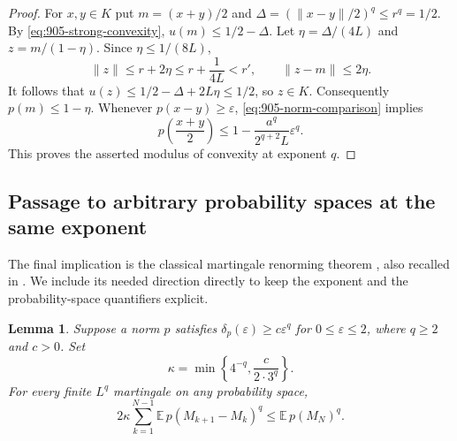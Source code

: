 \documentclass[11pt,a4paper]{article}
\newtheorem{lemma}[theorem]{Lemma}
\theoremstyle{remark}
\begin{document}
\begin{proof}
For $x,y\in K$ put $m=(x+y)/2$ and
$\Delta=(\|x-y\|/2)^q\leq r^q=1/2$.
By \eqref{eq:905-strong-convexity}, $u(m)\leq1/2-\Delta$.
Let $\eta=\Delta/(4L)$ and $z=m/(1-\eta)$.  Since
$\eta\leq1/(8L)$,
\[
 \|z\|\leq r+2\eta\leq r+\frac1{4L}<r',\qquad
 \|z-m\|\leq2\eta.
\]
It follows that $u(z)\leq1/2-\Delta+2L\eta\leq1/2$, so $z\in K$.
Consequently $p(m)\leq1-\eta$.  Whenever $p(x-y)\geq\varepsilon$,
\eqref{eq:905-norm-comparison} implies
\[
 p\left(\frac{x+y}{2}\right)
 \leq1-\frac{a^q}{2^{q+2}L}\varepsilon^q.
\]
This proves the asserted modulus of convexity at exponent $q$.
\end{proof}

\subsection{Passage to arbitrary probability spaces at the same exponent}

The final implication is the classical martingale renorming theorem
\cite{Pisier1975}, also recalled in \cite[Theorem~1]{HM2019}.
We include its needed direction directly to keep the exponent and the
probability-space quantifiers explicit.

\begin{lemma}\label{lem:905-martingale}
Suppose a norm $p$ satisfies $\delta_p(\varepsilon)\ge c\varepsilon^q$
for $0\le\varepsilon\le2$, where $q\ge2$ and $c>0$. Set
\[
 \kappa=\min\left\{4^{-q},\frac{c}{2\cdot3^q}\right\}.
\]
For every finite $L^q$ martingale on any probability space,
\[
 2\kappa\sum_{k=1}^{N-1}\mathbb E\,p(M_{k+1}-M_k)^q
 \le \mathbb E\,p(M_N)^q.
\]
\end{lemma}
\end{document}
